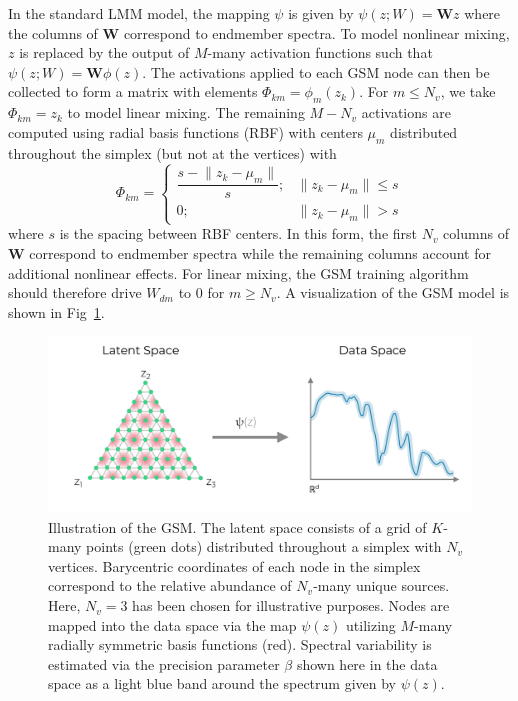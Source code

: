 \documentclass[remotesensing,article,submit,pdftex,moreauthors]{Definitions/mdpi}
\begin{document}
In the standard LMM model, the mapping $\psi$ is given by $\psi(z;W) = \mathbf{W}z$ where the columns of $\mathbf{W}$ correspond to endmember spectra. To model nonlinear mixing, $z$ is replaced by the output of $M$-many activation functions such that $\psi(z;W) = \mathbf{W}\phi(z)$. The activations applied to each GSM node can then be collected to form a matrix with elements $\Phi_{km} = \phi_m(z_k)$. For $m \leq N_v$, we take $\Phi_{km} = z_k$ to model linear mixing. The remaining  $M-N_v$ activations are computed using radial basis functions (RBF) with centers $\mu_m$ distributed throughout the simplex (but not at the vertices) with 
\begin{equation}\label{eq:act-function}
    \Phi_{km} = \begin{cases}
        \dfrac{s - \lVert z_k - \mu_m \rVert}{s}; & \lVert z_k - \mu_m \rVert \leq s \\
        0; & \lVert z_k - \mu_m \rVert > s
    \end{cases}
\end{equation}
where $s$ is the spacing between RBF centers. In this form, the first $N_v$ columns of $\mathbf{W}$ correspond to endmember spectra while the remaining columns account for additional nonlinear effects. For linear mixing, the GSM training algorithm should therefore drive $W_{dm}$ to $0$ for $m\geq N_v$. A visualization of the GSM model is shown in Fig~\ref{fig:gsm-diagram}.

\begin{figure}[H]
\includegraphics[width=\columnwidth]{methods/gsm/gsm-diagram.pdf}
\caption{Illustration of the GSM. The latent space consists of a grid of $K$-many points (green dots) distributed throughout a simplex with $N_v$ vertices. Barycentric coordinates of each node in the simplex correspond to the relative abundance of $N_v$-many unique sources. Here, $N_v=3$ has been chosen for illustrative purposes. Nodes are mapped into the data space via the map $\psi(z)$ utilizing $M$-many radially symmetric basis functions (red). Spectral variability is estimated via the precision parameter $\beta$ shown here in the data space as a light blue band around the spectrum given by $\psi(z)$.}
\label{fig:gsm-diagram}
\end{figure}  
\end{document}
